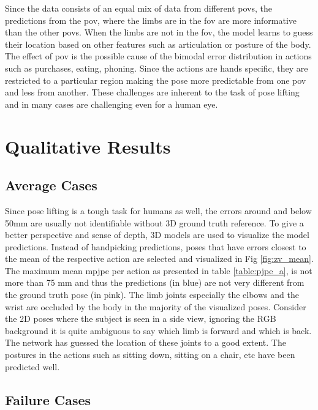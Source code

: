 Since the data consists of an equal mix of data from different \acp{pov}, the predictions from the \ac{pov}, where the limbs are in the \ac{fov} are more informative than the other \acp{pov}. When the limbs are not in the \ac{fov}, the model learns to guess their location based on other features such as articulation or posture of the body. The effect of \ac{pov} is the possible cause of the bimodal error distribution in actions such as purchases, eating, phoning. Since the actions are hands specific, they are restricted to a particular region making the pose more predictable from one \ac{pov} and less from another. These challenges are inherent to the task of pose lifting and in many cases are challenging even for a human eye.


\section{Qualitative Results}
\subsection{Average Cases}
Since pose lifting is a tough task for humans as well, the errors around and below 50mm are usually not identifiable without 3D ground truth reference. To give a better perspective and sense of depth, 3D models are used to visualize the model predictions. Instead of handpicking predictions, poses that have errors closest to the mean of the respective action are selected and visualized in Fig \ref{fig:zv_mean}. The maximum mean \ac{mpjpe} per action as presented in table \ref{table:pjpe_a}, is not more than 75 mm and thus the predictions (in blue) are not very different from the ground truth pose (in pink). The limb joints especially the elbows and the wrist are occluded by the body in the majority of the visualized poses. Consider the 2D poses where the subject is seen in a side view, ignoring the RGB background it is quite ambiguous to say which limb is forward and which is back. The network has guessed the location of these joints to a good extent. The postures in the actions such as sitting down, sitting on a chair, etc have been predicted well.




\subsection{Failure Cases}

